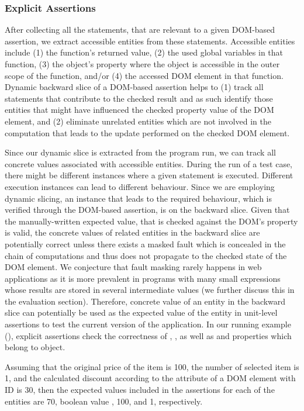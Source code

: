 \subsubsection{Explicit Assertions} \label{Sec:explicitAssertions}
After collecting all the statements, that are relevant to a given DOM-based assertion, we extract accessible entities from these statements.
Accessible entities include (1) the function's returned value, (2) the used global variables in that function, (3) the object's property where the object is accessible in the outer scope of the function, and/or (4) the accessed DOM element in that function. Dynamic backward slice of a DOM-based assertion helps to (1) track all statements that contribute to the checked result and as such identify those entities that might have influenced the checked property value of the DOM element, and (2) eliminate unrelated entities which are not involved in the computation that leads to the update performed on the checked DOM element.

Since our dynamic slice is extracted from the program run, we can track all concrete values associated with accessible entities.
During the run of a test case, there might be different instances where a given statement is executed. Different execution instances can lead to different behaviour. Since we are employing dynamic slicing, an instance that leads to the required behaviour, which is verified through the DOM-based assertion, is on the backward slice. Given that the manually-written expected value, that is checked against the DOM's property is valid, the concrete values of related entities in the backward slice are potentially correct unless there exists a masked fault which is concealed in the chain of computations and thus does not propagate to the checked state of the DOM element. We conjecture that fault masking rarely happens in \javascript web applications as it is more prevalent in programs with many small expressions whose results are stored in several intermediate values (we further discuss this in the evaluation section). Therefore, concrete value of an entity in the backward slice can potentially be used as the expected value of the entity in unit-level assertions to test the current version of the application.
In our running example (), explicit assertions check the correctness of , , as well as  and  properties which belong to  object.  

Assuming that the original price of the item is 100, the number of selected item is 1, and the calculated discount according to the  attribute of a DOM element with ID  is 30, then the expected values included in the assertions for each of the entities are 70, boolean value , 100, and 1, respectively.  

